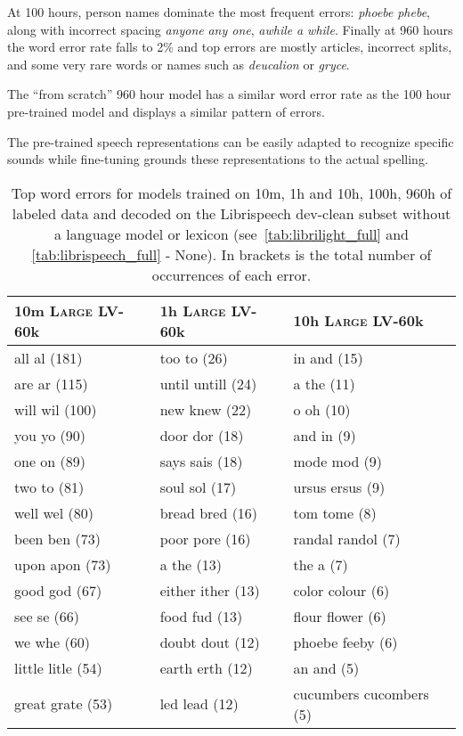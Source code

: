 \documentclass{article}
\newcommand{\wvppbig}{\textsc{Large}}
\newcommand{\voxsz}{LV-60k}
\begin{document}
At 100 hours, person names dominate the most frequent errors: 
\emph{phoebe}  \emph{phebe}, along with incorrect spacing \emph{anyone}  \emph{any one}, \emph{awhile}  \emph{a while}. 
Finally at 960 hours the word error rate falls to 2\% and top errors are mostly articles, incorrect splits, and some very rare words or names such as \emph{deucalion} or \emph{gryce}.

The “from scratch” 960 hour model has a similar word error rate as the 100 hour pre-trained model and displays a similar pattern of errors.

The pre-trained speech representations can be easily adapted to recognize specific sounds while fine-tuning grounds these representations to the actual spelling.


\begin{table}
\caption{Top word errors for models trained on 10m, 1h and 10h, 100h, 960h of labeled data and decoded on the Librispeech dev-clean subset without a language model or lexicon (see~\autoref{tab:librilight_full} and \autoref{tab:librispeech_full} - None). In brackets is the total number of occurrences of each error.
}
\label{tbl:errors}
\centering 
\begin{tabular}{l|l|l}
\toprule
10m \wvppbig{} \voxsz{} & 1h \wvppbig{} \voxsz{} & 10h \wvppbig{} \voxsz{} \\
\midrule
all  al (181) &too  to (26) &in  and (15) \\
are  ar (115) &until  untill (24) &a  the (11) \\
will  wil (100) &new  knew (22) &o  oh (10) \\
you  yo (90) &door  dor (18) &and  in (9) \\
one  on (89) &says  sais (18) &mode  mod (9) \\
two  to (81) &soul  sol (17) &ursus  ersus (9) \\
well  wel (80) &bread  bred (16) &tom  tome (8) \\
been  ben (73) &poor  pore (16) &randal  randol (7) \\
upon  apon (73) &a  the (13) &the  a (7) \\
good  god (67) &either  ither (13) &color  colour (6) \\
see  se (66) &food  fud (13) &flour  flower (6) \\
we  whe (60) &doubt  dout (12) &phoebe  feeby (6) \\
little  litle (54) &earth  erth (12) &an  and (5) \\
great  grate (53) &led  lead (12) &cucumbers  cucombers (5) \\

\end{tabular}
\end{table}
\end{document}
